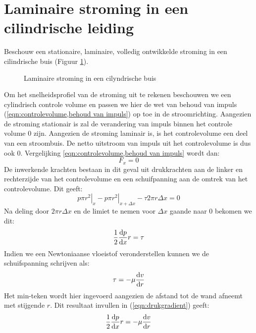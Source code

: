 	\FloatBarrier
	\section{Laminaire stroming in een cilindrische leiding}
	\label{sec:Laminaire stroming in een cilindrische leiding}
Beschouw een stationaire, laminaire, volledig ontwikkelde stroming in een cilindrische buis (Figuur \ref{fig:laminaire_stroming_in_buis}).

\begin{figure}
	\centering
	
	\caption{Laminaire stroming in een cilyndrische buis}
	\label{fig:laminaire_stroming_in_buis}
\end{figure}
Om het snelheidsprofiel van de stroming uit te rekenen beschouwen we een cylindrisch controle volume en passen we hier de wet van behoud van impuls (\ref{eqn:controlevolume,behoud van impuls}) op toe in de stroomrichting. Aangezien de stroming stationair is zal de verandering van impuls binnen het controle volume $0$ zijn. Aangezien de stroming laminair is, is het controlevolume een deel van een stroombuis. De netto uitstroom van impuls uit het controlevolume is dus ook $0$. Vergelijking \ref{eqn:controlevolume,behoud van impuls} wordt dan:
\begin{equation}
	F_x = 0
\end{equation}
De inwerkende krachten bestaan in dit geval uit drukkrachten aan de linker en rechterzijde van het controlevolume en een schuifpanning aan de omtrek van het controlevolume. Dit geeft:
\begin{equation}
	\left. p \pi r^2\right|_{x} - \left. p \pi r^2\right|_{x+\Delta x} -  \tau 2 \pi r \Delta x = 0
\end{equation}
Na deling door $2\pi r \Delta x$ en de limiet te nemen voor $\Delta x$ gaande naar $0$ bekomen we dit:
\begin{equation}
	\frac{1}{2} \frac{\mathrm{d} p}{\mathrm{d} x} r= \tau
	\label{eqn:drukgradient}
\end{equation}
Indien we een Newtoniaanse vloeistof veronderstellen kunnen we de schuifspanning schrijven als:
\begin{equation}
	\tau = -\mu \frac{\mathrm{d} v}{\mathrm{d} r}
\end{equation}
Het min-teken wordt hier ingevoerd aangezien de afstand tot de wand afneemt met stijgende $r$. Dit resultaat invullen in (\ref{eqn:drukgradient}) geeft:
\begin{equation}
	\frac{1}{2} \frac{\mathrm{d} p}{\mathrm{d} x} r = -\mu \frac{\mathrm{d} v}{\mathrm{d} r}
\end{equation}
